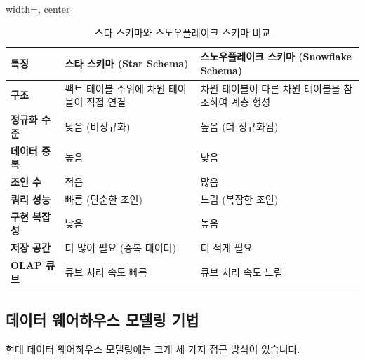 \documentclass[11pt,a4paper]{article}
\theoremstyle{definition}
\begin{document}
\begin{table}[h!]
\centering
\caption{스타 스키마와 스노우플레이크 스키마 비교}
\label{tab:star_snowflake_comparison}
\begin{adjustbox}{width=\textwidth, center}
\begin{tabular}{p{}p{}p{}}
\toprule
\textbf{특징} & \textbf{스타 스키마 (Star Schema)} & \textbf{스노우플레이크 스키마 (Snowflake Schema)} \\
\midrule
\textbf{구조} & 팩트 테이블 주위에 차원 테이블이 직접 연결 & 차원 테이블이 다른 차원 테이블을 참조하여 계층 형성 \\
\textbf{정규화 수준} & 낮음 (비정규화) & 높음 (더 정규화됨) \\
\textbf{데이터 중복} & 높음 & 낮음 \\
\textbf{조인 수} & 적음 & 많음 \\
\textbf{쿼리 성능} & 빠름 (단순한 조인) & 느림 (복잡한 조인) \\
\textbf{구현 복잡성} & 낮음 & 높음 \\
\textbf{저장 공간} & 더 많이 필요 (중복 데이터) & 더 적게 필요 \\
\textbf{OLAP 큐브} & 큐브 처리 속도 빠름 & 큐브 처리 속도 느림 \\
\bottomrule
\end{tabular}
\end{adjustbox}
\end{table}

\subsection{데이터 웨어하우스 모델링 기법}
현대 데이터 웨어하우스 모델링에는 크게 세 가지 접근 방식이 있습니다.
\end{document}
